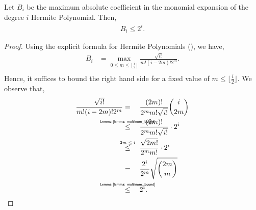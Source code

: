 \documentclass[final,12pt]{colt2018} %
\newcommand{\explain}[2]{\mathrel{\overset{\makebox[0pt]{\mbox{\normalfont\tiny\sffamily #1}}}{#2}}}
\begin{document}
\begin{lemma}
\label{lemma: max_coeff_hermite}
Let $B_i$ be the maximum absolute coefficient in the monomial expansion of the degree $i$ Hermite Polynomial. Then,
\begin{align*}
    B_i \leq 2^i.
\end{align*}
\end{lemma}
\begin{proof}
Using the explicit formula for Hermite Polynomials (), we have,
\begin{align*}
    B_i & = \max_{0 \leq m \leq \lfloor\frac{i}{2}\rfloor} \frac{\sqrt{i!}}{m!(i-2m)!2^m}.\\ 
\end{align*}
Hence, it suffices to bound the right hand side for a fixed value of $m \leq \lfloor \frac{i}{2}\rfloor$. We observe that,
\begin{align*}
    \frac{\sqrt{i!}}{m!(i-2m)!2^m} &= \quad \frac{(2m)!}{2^m m! \sqrt{i!}} \binom{i}{2m} \\
    & \explain{Lemma \ref{lemma: multinom_bound}}{\leq} \quad \frac{(2m)!}{2^m m! \sqrt{i!}} \cdot 2^i \\
    & \explain{$2m \leq i$}{\leq} \quad \frac{\sqrt{2m!}}{2^m m!} \cdot 2^i \\
    & = \quad \frac{2^i}{2^m} \sqrt{\binom{2m}{m}} \\
    & \explain{Lemma \ref{lemma: multinom_bound}}{\leq} \quad 2^i.
\end{align*}
\end{proof}
\end{document}
